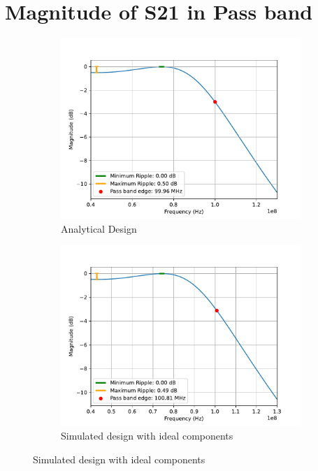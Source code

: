 \documentclass[letterpaper,12pt]{article}
\begin{document}
\section{Magnitude of S21 in Pass band\label{sec:s21_pass}}
\begin{figure}[H]
    \begin{subfigure}[t]{.49\textwidth}
      \centering
      \includegraphics[width=\linewidth]{figures/4.analytical}
      \caption{Analytical Design}
    \end{subfigure}
    \hfill
    \begin{subfigure}[t]{.49\textwidth}
      \centering
      \includegraphics[width=\linewidth]{figures/4.ideal}
      \caption{Simulated design with ideal components}
    \end{subfigure}
  

\end{figure}
\end{document}
